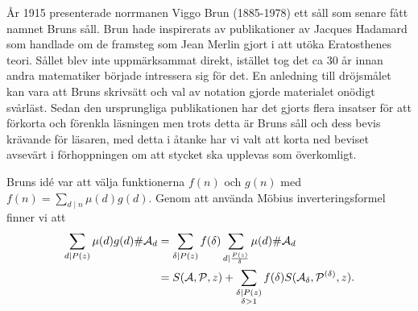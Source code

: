 
År 1915 presenterade norrmanen Viggo Brun (1885-1978) ett såll som senare fått namnet Bruns såll. Brun hade inspirerats av publikationer av Jacques Hadamard som handlade om de framsteg som Jean Merlin gjort i att utöka Eratosthenes teori. Sållet blev inte uppmärksammat direkt, istället tog det ca 30 år innan andra matematiker började intressera sig för det. En anledning till dröjsmålet kan vara att Bruns skrivsätt och val av notation gjorde materialet onödigt svårläst. Sedan den ursprungliga publikationen har det gjorts flera insatser för att förkorta och förenkla läsningen men trots detta är Bruns såll och dess bevis krävande för läsaren, med detta i åtanke har vi valt att korta ned beviset avsevärt i förhoppningen om att stycket ska upplevas som överkomligt.

\bigskip\noindent
Bruns idé var att välja funktionerna $f(n)$ och $g(n)$ med $f(n) = \sum_{d\mid n} \mu(d) g(d)$. Genom att använda Möbius inverteringsformel finner vi att
\begin{align*}
    \sum_{d\mid P(z)} \mu(d) g(d) \# \mathcal{A}_d 
    &= \sum_{\delta\mid P(z)} f(\delta) \sum_{d\mid \frac{P(z)}{\delta}} \mu(d) \# \mathcal{A}_d \\
    &= S(\mathcal{\mathcal{A}}, \mathcal{\mathcal{P}}, z) + \sum_{\substack{\delta\mid P(z) \\ \delta>1}} f(\delta) S(\mathcal{\mathcal{A}_\delta}, \mathcal{\mathcal{P}^{(\delta)}}, z).
\end{align*}